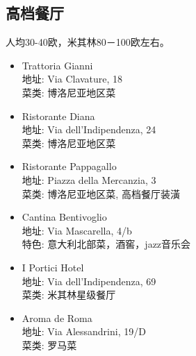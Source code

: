 \subsection{高档餐厅}
人均30-40欧，米其林80－100欧左右。

\begin{itemize}
\item Trattoria Gianni\\
地址: Via Clavature, 18\\
菜类: 博洛尼亚地区菜

\item Ristorante Diana\\
地址: Via dell'Indipendenza, 24\\
菜类: 博洛尼亚地区菜

\item Ristorante Pappagallo\\
地址: Piazza della Mercanzia, 3\\
菜类: 博洛尼亚地区菜, 高档餐厅装潢

\item Cantina Bentivoglio\\
地址: Via Mascarella, 4/b\\
特色: 意大利北部菜，酒窖，jazz音乐会

\item I Portici Hotel\\
地址: Via dell'Indipendenza, 69\\
菜类: 米其林星级餐厅

\item Aroma de Roma\\
地址: Via Alessandrini, 19/D\\
菜类: 罗马菜
\end{itemize}


